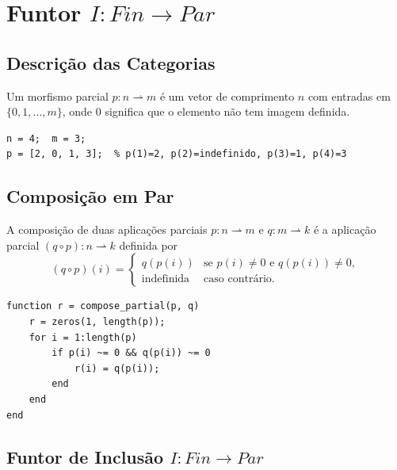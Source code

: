 \section{Funtor \texorpdfstring{$I: Fin \to Par$}{I: Fin -> Par}}
\label{sec:functor-fin-par}

\subsection{Descrição das Categorias}

\begin{definition}
Um morfismo parcial $p: n \rightharpoonup m$ é um vetor de comprimento $n$ com entradas em $\{0, 1,\ldots,m\}$, onde $0$ significa que o elemento não tem imagem definida.
\end{definition}

\begin{lstlisting}[style=matlab, caption={Morfismo parcial em $\mathbf{Par}$}]
n = 4;  m = 3;
p = [2, 0, 1, 3];  % p(1)=2, p(2)=indefinido, p(3)=1, p(4)=3
\end{lstlisting}

\subsection{Composição em Par}

A composição de duas aplicações parciais $p: n \rightharpoonup m$ e $q: m \rightharpoonup k$ é a aplicação parcial $(q \circ p): n \rightharpoonup k$ definida por
\[
    (q \circ p)(i) =
    \begin{cases}
        q(p(i)) & \text{se } p(i) \neq 0 \text{ e } q(p(i)) \neq 0,\\
        \text{indefinida} & \text{caso contrário.}
    \end{cases}
\]

\begin{lstlisting}[style=matlab, caption={Composição de aplicações parciais}]
function r = compose_partial(p, q)
    r = zeros(1, length(p));
    for i = 1:length(p)
        if p(i) ~= 0 && q(p(i)) ~= 0
            r(i) = q(p(i));
        end
    end
end
\end{lstlisting}

\subsection{Funtor de Inclusão \texorpdfstring{$I: Fin \to Par$}{I: Fin -> Par}}

